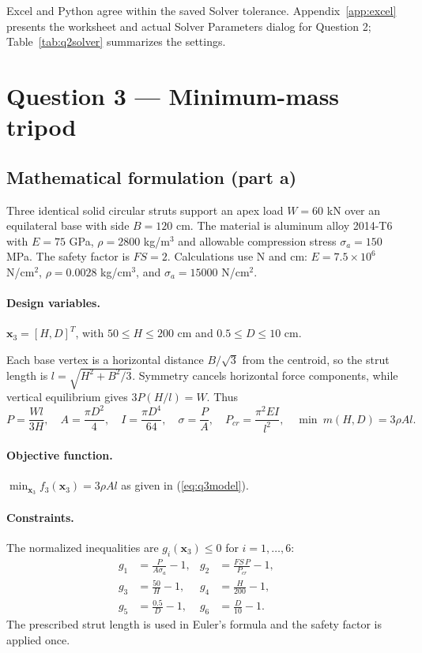 \documentclass[11pt,a4paper]{article}
\begin{document}
Excel and Python agree within the saved Solver tolerance. Appendix~\ref{app:excel} presents the worksheet and actual Solver Parameters dialog for Question 2; Table~\ref{tab:q2solver} summarizes the settings.

\clearpage
\section{Question 3 --- Minimum-mass tripod}
\subsection{Mathematical formulation (part a)}
Three identical solid circular struts support an apex load $W=60$ kN over an equilateral base with side $B=120$ cm. The material is aluminum alloy 2014-T6 with $E=75$ GPa, $\rho=2800$ kg/m$^3$ and allowable compression stress $\sigma_a=150$ MPa. The safety factor is $FS=2$. Calculations use N and cm: $E=7.5\times10^6$ N/cm$^2$, $\rho=0.0028$ kg/cm$^3$, and $\sigma_a=15000$ N/cm$^2$.

\paragraph{Design variables.} $\mathbf{x}_3=[H,D]^T$, with $50\le H\le200$ cm and $0.5\le D\le10$ cm.

Each base vertex is a horizontal distance $B/\sqrt{3}$ from the centroid, so the strut length is $l=\sqrt{H^2+B^2/3}$. Symmetry cancels horizontal force components, while vertical equilibrium gives $3P(H/l)=W$. Thus
\begin{equation}
P=\frac{Wl}{3H},\quad A=\frac{\pi D^2}{4},\quad I=\frac{\pi D^4}{64},\quad
\sigma=\frac{P}{A},\quad P_{cr}=\frac{\pi^2EI}{l^2},\quad
\min\ m(H,D)=3\rho Al.
\label{eq:q3model}
\end{equation}
\paragraph{Objective function.} $\min_{\mathbf{x}_3}f_3(\mathbf{x}_3)=3\rho A l$ as given in (\ref{eq:q3model}).

\paragraph{Constraints.} The normalized inequalities are $g_i(\mathbf{x}_3)\le0$ for $i=1,\ldots,6$:
\begin{align}
g_1&=\frac{P}{A\sigma_a}-1,&g_2&=\frac{FS\,P}{P_{cr}}-1,\\
g_3&=\frac{50}{H}-1,&g_4&=\frac{H}{200}-1,\\
g_5&=\frac{0.5}{D}-1,&g_6&=\frac{D}{10}-1.&&\label{eq:q3constraints}
\end{align}
The prescribed strut length is used in Euler's formula and the safety factor is applied once.
\end{document}
